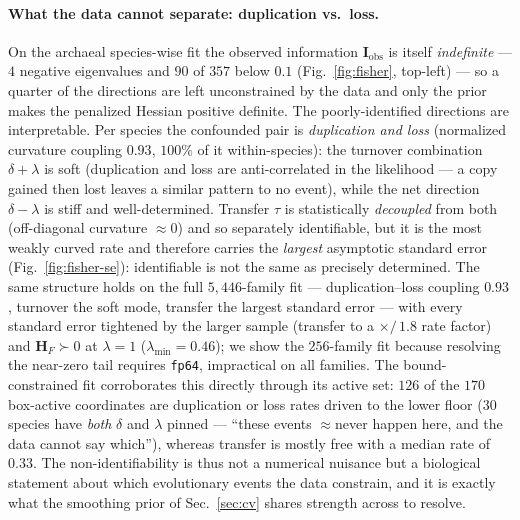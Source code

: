 \documentclass[11pt]{article}
\newcommand{\bdelta}{\delta}
\newcommand{\btau}{\tau}
\newcommand{\blambda}{\lambda}
\newcommand{\Hess}{\mathbf{H}}
\newcommand{\Fish}{\mathbf{I}}
\begin{document}
\paragraph{What the data cannot separate: duplication vs.\ loss.} On the
archaeal species-wise fit the observed information $\Fish_{\mathrm{obs}}$ is
itself \emph{indefinite} --- $4$ negative eigenvalues and $90$ of $357$ below
$0.1$ (Fig.~\ref{fig:fisher}, top-left) --- so a quarter of the directions are
left unconstrained by the data and only the prior makes the penalized Hessian
positive definite. The poorly-identified directions are interpretable. Per
species the confounded pair is \emph{duplication and loss} (normalized curvature
coupling $0.93$, $100\%$ of it within-species): the turnover combination
$\bdelta+\blambda$ is soft (duplication and loss are anti-correlated in the
likelihood --- a copy gained then lost leaves a similar pattern to no event),
while the net direction $\bdelta-\blambda$ is stiff and well-determined. Transfer
$\btau$ is statistically \emph{decoupled} from both (off-diagonal curvature
$\approx0$) and so separately identifiable, but it is the most weakly curved rate
and therefore carries the \emph{largest} asymptotic standard error
(Fig.~\ref{fig:fisher-se}): identifiable is not the same as precisely determined.
The same structure holds on the full $5{,}446$-family fit --- duplication--loss
coupling $0.93$, turnover the soft mode, transfer the largest standard error ---
with every standard error tightened by the larger sample (transfer to a
$\times/\,1.8$ rate factor) and $\Hess_F\succ0$ at $\lambda{=}1$
($\lambda_{\min}{=}0.46$); we show the $256$-family fit because resolving the
near-zero tail requires \texttt{fp64}, impractical on all families.
The bound-constrained fit corroborates this
directly through its active set: $126$ of the $170$ box-active coordinates are
duplication or loss rates driven to the lower floor ($30$ species have
\emph{both} $\bdelta$ and $\blambda$ pinned --- ``these events $\approx$never
happen here, and the data cannot say which''), whereas transfer is mostly free
with a median rate of $0.33$. The non-identifiability is thus not a numerical
nuisance but a biological statement about which evolutionary events the data
constrain, and it is exactly what the smoothing prior of Sec.~\ref{sec:cv}
shares strength across to resolve.
\end{document}
